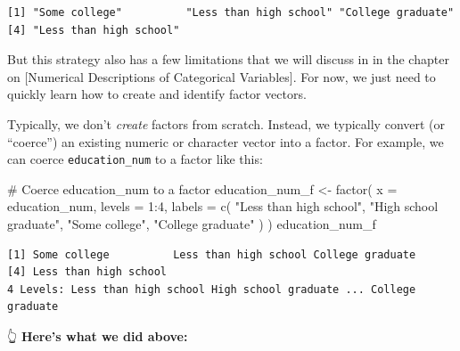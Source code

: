 \documentclass[
  letterpaper,
  DIV=11,
  numbers=noendperiod]{scrreprt}
\newenvironment{Shaded}{\begin{snugshade}}{\end{snugshade}}
\newcommand{\AttributeTok}[1]{\textcolor[rgb]{0.40,0.45,0.13}{#1}}
\newcommand{\CommentTok}[1]{\textcolor[rgb]{0.37,0.37,0.37}{#1}}
\newcommand{\DecValTok}[1]{\textcolor[rgb]{0.68,0.00,0.00}{#1}}
\newcommand{\FunctionTok}[1]{\textcolor[rgb]{0.28,0.35,0.67}{#1}}
\newcommand{\NormalTok}[1]{\textcolor[rgb]{0.00,0.23,0.31}{#1}}
\newcommand{\OtherTok}[1]{\textcolor[rgb]{0.00,0.23,0.31}{#1}}
\newcommand{\SpecialCharTok}[1]{\textcolor[rgb]{0.37,0.37,0.37}{#1}}
\newcommand{\StringTok}[1]{\textcolor[rgb]{0.13,0.47,0.30}{#1}}
\begin{document}
\begin{verbatim}
[1] "Some college"          "Less than high school" "College graduate"     
[4] "Less than high school"
\end{verbatim}

But this strategy also has a few limitations that we will discuss in in
the chapter on {[}Numerical Descriptions of Categorical Variables{]}.
For now, we just need to quickly learn how to create and identify factor
vectors.

Typically, we don't \emph{create} factors from scratch. Instead, we
typically convert (or ``coerce'') an existing numeric or character
vector into a factor. For example, we can coerce \texttt{education\_num}
to a factor like this:

\begin{Shaded}
\begin{Highlighting}[]
\CommentTok{\# Coerce education\_num to a factor}
\NormalTok{education\_num\_f }\OtherTok{\textless{}{-}} \FunctionTok{factor}\NormalTok{(}
  \AttributeTok{x      =}\NormalTok{ education\_num,}
  \AttributeTok{levels =} \DecValTok{1}\SpecialCharTok{:}\DecValTok{4}\NormalTok{,}
  \AttributeTok{labels =} \FunctionTok{c}\NormalTok{(}
    \StringTok{"Less than high school"}\NormalTok{, }\StringTok{"High school graduate"}\NormalTok{, }\StringTok{"Some college"}\NormalTok{, }
    \StringTok{"College graduate"}
\NormalTok{  )}
\NormalTok{)}
\NormalTok{education\_num\_f}
\end{Highlighting}
\end{Shaded}

\begin{verbatim}
[1] Some college          Less than high school College graduate     
[4] Less than high school
4 Levels: Less than high school High school graduate ... College graduate
\end{verbatim}

👆 \textbf{Here's what we did above:}
\end{document}
